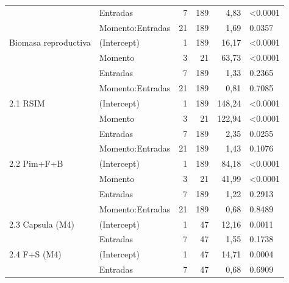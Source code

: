 \documentclass[12pt,oneside]{reedthesis}
\begin{document}
\begin{table}[!h]
{\begin{tabular}[t]{llrrrl}
 & Entradas & 7 & 189 & 4,83 & <0.0001\\
 & Momento:Entradas & 21 & 189 & 1,69 & 0.0357\\
\addlinespace
2 Biomasa reproductiva & (Intercept) & 1 & 189 & 16,17 & <0.0001\\
 & Momento & 3 & 21 & 63,73 & <0.0001\\
 & Entradas & 7 & 189 & 1,33 & 0.2365\\
 & Momento:Entradas & 21 & 189 & 0,81 & 0.7085\\
2.1 RSIM & (Intercept) & 1 & 189 & 148,24 & <0.0001\\
\addlinespace
 & Momento & 3 & 21 & 122,94 & <0.0001\\
 & Entradas & 7 & 189 & 2,35 & 0.0255\\
 & Momento:Entradas & 21 & 189 & 1,43 & 0.1076\\
2.2 Pim+F+B & (Intercept) & 1 & 189 & 84,18 & <0.0001\\
 & Momento & 3 & 21 & 41,99 & <0.0001\\
\addlinespace
 & Entradas & 7 & 189 & 1,22 & 0.2913\\
 & Momento:Entradas & 21 & 189 & 0,68 & 0.8489\\
2.3 Capsula (M4) & (Intercept) & 1 & 47 & 12,16 & 0.0011\\
 & Entradas & 7 & 47 & 1,55 & 0.1738\\
2.4 F+S (M4) & (Intercept) & 1 & 47 & 14,71 & 0.0004\\
\addlinespace
 & Entradas & 7 & 47 & 0,68 & 0.6909\\
\bottomrule
\end{tabular}}
\end{table}
\end{document}
